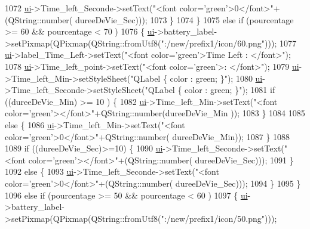 \begin{DoxyCode}
{1072                   \hyperlink{a00008_a6dc041ef6a2ffb329928d2913e8344e6}{ui}->Time\_left\_Seconde->setText(\textcolor{stringliteral}{"<font color='green'>0</font>"}+(QString::number(
      dureeDeVie\_Sec)));
1073               \}
1074          \}
1075           \textcolor{keywordflow}{else} \textcolor{keywordflow}{if} (pourcentage >= 60 && pourcentage < 70 )
1076           \{   \hyperlink{a00008_a6dc041ef6a2ffb329928d2913e8344e6}{ui}->battery\_label->setPixmap(QPixmap(QString::fromUtf8(\textcolor{stringliteral}{":/new/prefix1/icon/60.png"})));
1077               \hyperlink{a00008_a6dc041ef6a2ffb329928d2913e8344e6}{ui}->label\_Time\_Left->setText(\textcolor{stringliteral}{"<font color='green'>Time Left : </font>"});
1078               \hyperlink{a00008_a6dc041ef6a2ffb329928d2913e8344e6}{ui}->Time\_left\_point->setText(\textcolor{stringliteral}{"<font color='green'>: </font>"});
1079               \hyperlink{a00008_a6dc041ef6a2ffb329928d2913e8344e6}{ui}->Time\_left\_Min->setStyleSheet(\textcolor{stringliteral}{"QLabel \{ color : green; \}"});
1080               \hyperlink{a00008_a6dc041ef6a2ffb329928d2913e8344e6}{ui}->Time\_left\_Seconde->setStyleSheet(\textcolor{stringliteral}{"QLabel \{ color : green; \}"});
1081               \textcolor{keywordflow}{if} ((dureeDeVie\_Min) >=  10 ) \{
1082                   \hyperlink{a00008_a6dc041ef6a2ffb329928d2913e8344e6}{ui}->Time\_left\_Min->setText(\textcolor{stringliteral}{"<font color='green'></font>"}+QString::number(dureeDeVie\_Min
      ));
1083               \}
1084 
1085               \textcolor{keywordflow}{else} \{
1086                   \hyperlink{a00008_a6dc041ef6a2ffb329928d2913e8344e6}{ui}->Time\_left\_Min->setText(\textcolor{stringliteral}{"<font color='green'>0</font>"}+QString::number(
      dureeDeVie\_Min));
1087               \}
1088 
1089               \textcolor{keywordflow}{if} ((dureeDeVie\_Sec)>=10) \{
1090                   \hyperlink{a00008_a6dc041ef6a2ffb329928d2913e8344e6}{ui}->Time\_left\_Seconde->setText(\textcolor{stringliteral}{"<font color='green'></font>"}+(QString::number(
      dureeDeVie\_Sec)));
1091               \}
1092               \textcolor{keywordflow}{else} \{
1093                   \hyperlink{a00008_a6dc041ef6a2ffb329928d2913e8344e6}{ui}->Time\_left\_Seconde->setText(\textcolor{stringliteral}{"<font color='green'>0</font>"}+(QString::number(
      dureeDeVie\_Sec)));
1094               \}
1095          \}
1096           \textcolor{keywordflow}{else} \textcolor{keywordflow}{if} (pourcentage >= 50 && pourcentage < 60 )
1097           \{ \hyperlink{a00008_a6dc041ef6a2ffb329928d2913e8344e6}{ui}->battery\_label->setPixmap(QPixmap(QString::fromUtf8(\textcolor{stringliteral}{":/new/prefix1/icon/50.png"})));
}
\end{DoxyCode}
